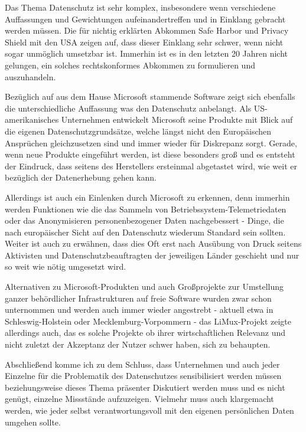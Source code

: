 Das Thema Datenschutz ist sehr komplex, insbesondere wenn verschiedene Auffassungen und Gewichtungen aufeinandertreffen und in Einklang gebracht werden müssen. Die für nichtig erklärten Abkommen \glqq Safe Harbor\grqq{} und \glqq Privacy Shield\grqq{} mit den USA zeigen auf, dass dieser Einklang sehr schwer, wenn nicht sogar unmöglich umsetzbar ist. Immerhin ist es in den letzten 20 Jahren nicht gelungen, ein solches rechtskonformes Abkommen zu formulieren und auszuhandeln.

Bezüglich auf aus dem Hause Microsoft stammende Software zeigt sich ebenfalls die unterschiedliche Auffassung was den Datenschutz anbelangt. Als US-amerikanisches Unternehmen entwickelt Microsoft seine Produkte mit Blick auf die eigenen Datenschutzgrundsätze, welche längst nicht den Europäischen Ansprüchen gleichzusetzen sind und immer wieder für Diskrepanz sorgt. Gerade, wenn neue Produkte eingeführt werden, ist diese besonders groß und es entsteht der Eindruck, dass seitens des Herstellers ersteinmal abgetastet wird, wie weit er bezüglich der Datenerhebung gehen kann.

Allerdings ist auch ein Einlenken durch Microsoft zu erkennen, denn immerhin werden Funktionen wie die das Sammeln von Betriebssystem-Telemetriedaten oder das Anonymisieren personenbezogener Daten nachgebessert - Dinge, die nach europäischer Sicht auf den Datenschutz wiederum Standard sein sollten. Weiter ist auch zu erwähnen, dass dies Oft erst nach Ausübung von Druck seitens Aktivisten und Datenschutzbeauftragten der jeweiligen Länder geschieht und nur so weit wie nötig umgesetzt wird.

Alternativen zu Microsoft-Produkten und auch Großprojekte zur Umstellung ganzer behördlicher Infrastrukturen auf freie Software wurden zwar schon unternommen und werden auch immer wieder angestrebt - aktuell etwa in Schleswig-Holstein oder Mecklemburg-Vorpommern - das LiMux-Projekt zeigte allerdings auch, das es solche Projekte ob ihrer wirtschaftlichen Relevanz und nicht zuletzt der Akzeptanz der Nutzer schwer haben, sich zu behaupten.

Abschließend komme ich zu dem Schluss, dass Unternehmen und auch jeder Einzelne für die Problematik des Datenschutzes sensibilisiert werden müssen beziehungsweise dieses Thema präsenter Diskutiert werden muss und es nicht genügt, einzelne Missstände aufzuzeigen. Vielmehr muss auch klargemacht werden, wie jeder selbst verantwortungsvoll mit den eigenen persönlichen Daten umgehen sollte.
\\